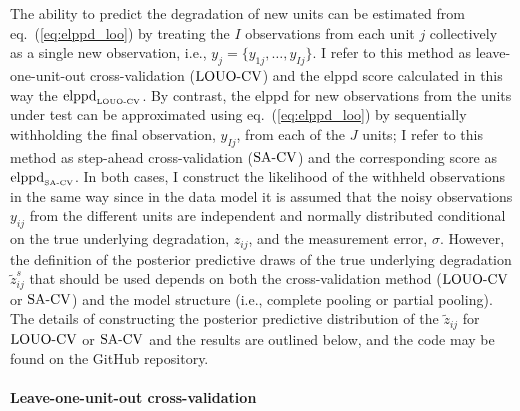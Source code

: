 The ability to predict the degradation of new units can be estimated from eq.~(\ref{eq:elppd_loo}) by treating the $I$ observations from each unit $j$ collectively as a single new observation, i.e., $y_j = \{y_{1j}, \ldots, y_{Ij}\}$. I refer to this method as leave-one-unit-out cross-validation ($\hbox{LOUO-CV}$) and the elppd score calculated in this way the $\hbox{elppd}_{\hbox{\tiny{LOUO-CV}}}$. By contrast, the elppd for new observations from the units under test can be approximated using eq.~(\ref{eq:elppd_loo}) by sequentially withholding the final observation, $y_{Ij}$, from each of the $J$ units; I refer to this method as step-ahead cross-validation ($\hbox{SA-CV}$) and the corresponding score as $\hbox{elppd}_{\hbox{\tiny{SA-CV}}}$. In both cases, I construct the likelihood of the withheld observations in the same way since in the data model it is assumed that the noisy observations $y_{ij}$ from the different units are independent and normally distributed conditional on the true underlying degradation, $z_{ij}$, and the measurement error, $\sigma$. However, the definition of the posterior predictive draws of the true underlying degradation $\tilde{z}^{s}_{ij}$ that should be used depends on both the cross-validation method ($\hbox{LOUO-CV}$ or $\hbox{SA-CV}$) and the model structure (i.e., complete pooling or partial pooling). The details of constructing the posterior predictive distribution of the $\tilde{z}_{ij}$ for $\hbox{LOUO-CV}$ or $\hbox{SA-CV}$ and the results are outlined below, and the code may be found on the GitHub repository.



\paragraph{Leave-one-unit-out cross-validation} 

